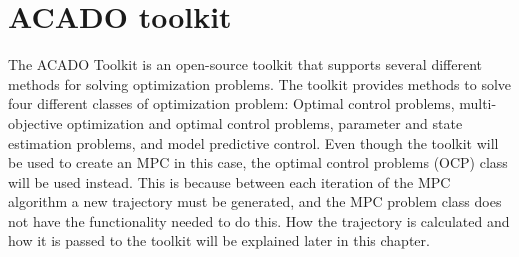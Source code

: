 \section{ACADO toolkit}

The ACADO Toolkit \cite{acadoHOUSKA} is an open-source toolkit that supports several different methods for solving optimization problems. The toolkit provides methods to solve four different classes of optimization problem: Optimal control problems, multi-objective optimization and optimal control problems, parameter and state estimation problems, and model predictive control. Even though the toolkit will be used to create an MPC in this case, the optimal control problems (OCP) class will be used instead. This is because between each iteration of the MPC algorithm a new trajectory must be generated, and the MPC problem class does not have the functionality needed to do this. How the trajectory is calculated and how it is passed to the toolkit will be explained later in this chapter.






